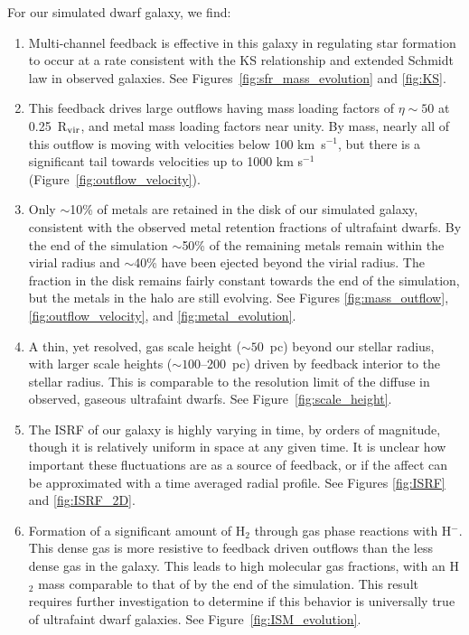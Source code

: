 \documentclass[twocolumn]{aastex61}
\begin{document}
For our simulated dwarf galaxy, we find:
\begin{enumerate}
\item Multi-channel feedback is effective in this galaxy in regulating star formation 
   to occur at a rate 
consistent with the KS relationship and extended Schmidt law in observed galaxies. See Figures~\ref{fig:sfr_mass_evolution} and \ref{fig:KS}.

\item This feedback drives large outflows 
   having mass loading factors of $\eta \sim 50$ at 0.25~R$_{\rm vir}$, and
metal mass loading factors near unity. By mass, nearly all of this outflow is moving with velocities below 100 km~s$^{-1}$, but there is a significant tail towards velocities up to 1000 km s$^{-1}$ (Figure~\ref{fig:outflow_velocity}). 

\item 
    Only $\sim$10\% of metals are retained in the disk of our simulated galaxy, consistent with the observed metal retention fractions of ultrafaint dwarfs.  By the end of the simulation $\sim$50\% of the remaining metals remain within the virial radius and $\sim$40\% 
have been ejected beyond the virial radius. The fraction in the disk remains fairly constant towards the end of the simulation, but the metals in the halo are still evolving. See Figures \ref{fig:mass_outflow}, \ref{fig:outflow_velocity}, and \ref{fig:metal_evolution}.

\item A thin, yet resolved, gas scale height ($\sim 50$~pc) beyond our stellar radius, with larger scale heights ($\sim 100$--200~pc) driven by feedback interior to the stellar radius. This is comparable to the resolution limit of the diffuse  in observed, gaseous ultrafaint dwarfs. See Figure~\ref{fig:scale_height}.

\item The ISRF of our galaxy is highly varying in time, by orders of magnitude, though it is relatively uniform in space at any given time. It is unclear how important these fluctuations are as a source of feedback, or if the affect can 
be approximated with a time averaged radial profile. See Figures \ref{fig:ISRF} and \ref{fig:ISRF_2D}.

\item Formation of a significant amount of H$_2$ through gas phase reactions with H$^-$. This dense gas is more resistive to feedback driven outflows than the less dense gas in the galaxy. This leads to high molecular gas fractions, with an H$_2$ mass comparable to that of  by the end of the simulation. This result requires further investigation to determine if this behavior is universally true of ultrafaint dwarf galaxies. See Figure~\ref{fig:ISM_evolution}.
\end{enumerate}
\end{document}

